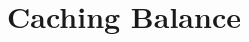 \documentclass{article}
\theoremstyle{definition}{
  \newtheorem{lemma}{Lemma}[section] %
  \newtheorem{definition}[lemma]{Definition}
}
\theoremstyle{theorem}{
  \newtheorem{invariant}[lemma]{Invariant}
  \newtheorem{proofobligation}[lemma]{Proof Obligation}
}
\numberwithin{equation}{lemma}
\begin{document}
%
%

\section{Caching Balance}
\label{sec:caching_balance}
\end{document}
